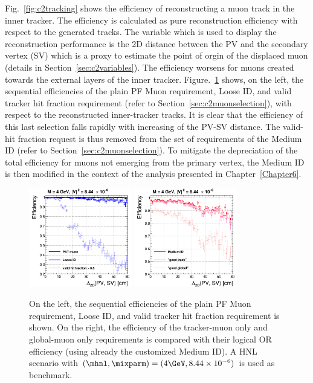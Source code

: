 Fig.~\ref{fig:c2tracking} shows the efficiency of
reconstructing a muon track in the inner tracker. The efficiency is
calculated as pure reconstruction efficiency with respect to the
generated tracks. The variable which is used to display the reconstruction
performance is the 2D distance between the PV and the secondary vertex (SV)
which is a proxy to estimate the point of orgin of the
displaced muon (details in Section~\ref{sec:c2variables}). The efficiency worsens for muons created towards the external layers of the inner
tracker.
Figure.~\ref{fig:c2tracking2} shows, on the left, the sequential
efficiencies of the plain PF Muon requirement,
Loose ID, and
valid tracker hit fraction requirement (refer to
Section~\ref{sec:c2muonselection}), with respect to the reconstructed inner-tracker tracks. It is clear that the efficiency of
this last selection 
falls rapidly with increasing of the PV-SV
distance. 
The valid-hit fraction request is thus removed from the set of
requirements of the Medium ID (refer to Section~\ref{sec:c2muonselection}). To mitigate the depreciation of the
total efficiency for muons not emerging from the primary vertex, the
Medium ID is then modified in the context of the analysis presented in
Chapter~\ref{Chapter6}. 

\begin{figure}[h!]
\centering
  \includegraphics[width=0.4\textwidth]{Figures/c6/object/loose_validFraction_M-4_V-0p00290516780927_rho.png}
  \includegraphics[width=0.4\textwidth]{Figures/c6/object/goodTrack_goodGlobal_M-4_V-0p00290516780927_rho.png}
  \caption{On the left, the sequential
efficiencies of the plain PF Muon requirement, Loose ID, and
valid tracker hit fraction requirement is shown. On the right, the efficiency of the tracker-muon only and
    global-muon only requirements is compared with their logical OR
    efficiency (using already the customized Medium ID). A HNL scenario with
    $(\mhnl,\mixparm)=(4\GeV,8.44\times10^{-6})$ is used as
    benchmark. \dani}
  \label{fig:c2tracking2}
\end{figure}

